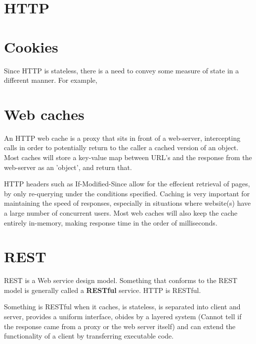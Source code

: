 \section{HTTP}
\section{Cookies}
Since HTTP is stateless, there is a need to convey some measure of state in
a different manner. For example, 
\section{Web caches}
An HTTP web cache is a proxy that sits in front of a web-server, intercepting
calls in order to potentially return to the caller a cached version of an object.
Most caches will store a key-value map between URL's and the response from the web-server
as an 'object', and return that.

HTTP headers such as If-Modified-Since allow for the effecient retrieval of pages,
by only re-querying under the conditions specified. Caching is very important for
maintaining the speed of responses, especially in situations where website(s) have
a large number of concurrent users. Most web caches will also keep the cache entirely
in-memory, making response time in the order of milliseconds.

\section{REST}
REST is a Web service design model. Something that conforms to the REST model is
generally called a \textbf{RESTful} service. HTTP is RESTful.

Something is RESTful when it caches, is stateless, is separated into client and server,
provides a uniform interface, obides by a layered system (Cannot tell if the response
came from a proxy or the web server itself) and can extend the functionality of a
client by transferring executable code.
